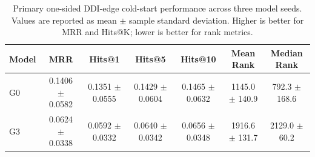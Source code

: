 \begin{table}[t]
\centering
\caption{Primary one-sided DDI-edge cold-start performance across three model seeds. Values are reported as mean $\pm$ sample standard deviation. Higher is better for MRR and Hits@K; lower is better for rank metrics.}
\label{tab:cold_start_results}
\begin{tabular}{lcccccc}
\hline
Model & MRR & Hits@1 & Hits@5 & Hits@10 & Mean Rank & Median Rank \\
\hline
G0 & 0.1406 $\pm$ 0.0582 & 0.1351 $\pm$ 0.0555 & 0.1429 $\pm$ 0.0604 & 0.1465 $\pm$ 0.0632 & 1145.0 $\pm$ 140.9 & 792.3 $\pm$ 168.6 \\
G3 & 0.0624 $\pm$ 0.0338 & 0.0592 $\pm$ 0.0332 & 0.0640 $\pm$ 0.0342 & 0.0656 $\pm$ 0.0348 & 1916.6 $\pm$ 131.7 & 2129.0 $\pm$ 60.2 \\
\hline
\end{tabular}
\end{table}
